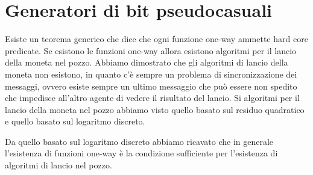 \chapter{Generatori di bit pseudocasuali}
\label{chapter9}

Esiste un teorema generico che dice che ogni funzione one-way ammette hard core predicate. Se esistono le funzioni one-way allora esistono algoritmi per il lancio della moneta nel pozzo. Abbiamo dimostrato che gli algoritmi di lancio della moneta non esistono, in quanto c'è sempre un problema di sincronizzazione dei messaggi, ovvero esiste sempre un ultimo messaggio che può essere non spedito che impedisce all'altro agente di vedere il risultato del lancio. Si algoritmi per il lancio della moneta nel pozzo abbiamo visto quello basato sul residuo quadratico e quello basato sul logaritmo discreto.

Da quello basato sul logaritmo discreto abbiamo ricavato che in generale l'esistenza di funzioni one-way è la condizione sufficiente per l'esistenza di algoritmi di lancio nel pozzo.

